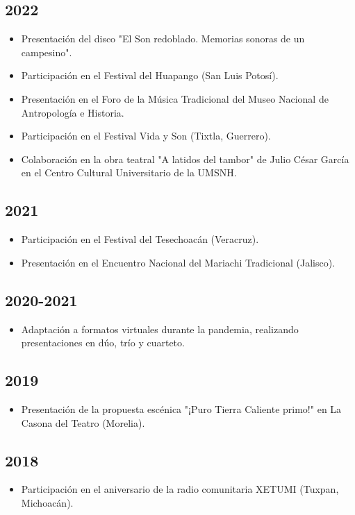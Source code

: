 \documentclass{article}
\begin{document}
\subsection*{2022}
\begin{itemize}[leftmargin=*]
    \item Presentación del disco "El Son redoblado. Memorias sonoras de un campesino".
    \item Participación en el Festival del Huapango (San Luis Potosí).
    \item Presentación en el Foro de la Música Tradicional del Museo Nacional de Antropología e Historia.
    \item Participación en el Festival Vida y Son (Tixtla, Guerrero).
    \item Colaboración en la obra teatral "A latidos del tambor" de Julio César García en el Centro Cultural Universitario de la UMSNH.
\end{itemize}

\subsection*{2021}
\begin{itemize}[leftmargin=*]
    \item Participación en el Festival del Tesechoacán (Veracruz).
    \item Presentación en el Encuentro Nacional del Mariachi Tradicional (Jalisco).
\end{itemize}

\subsection*{2020-2021}
\begin{itemize}[leftmargin=*]
    \item Adaptación a formatos virtuales durante la pandemia, realizando presentaciones en dúo, trío y cuarteto.
\end{itemize}

\subsection*{2019}
\begin{itemize}[leftmargin=*]
    \item Presentación de la propuesta escénica "¡Puro Tierra Caliente primo!" en La Casona del Teatro (Morelia).
\end{itemize}

\subsection*{2018}
\begin{itemize}[leftmargin=*]
    \item Participación en el aniversario de la radio comunitaria XETUMI (Tuxpan, Michoacán).
\end{itemize}
\end{document}
